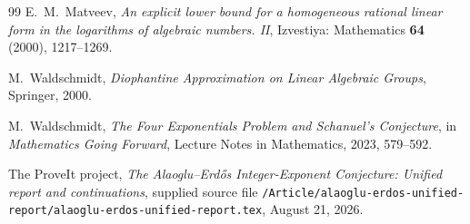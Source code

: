 \documentclass[11pt]{article}
\theoremstyle{definition}
\begin{document}
\begin{thebibliography}{99}
E.~M.~Matveev,
\newblock \emph{An explicit lower bound for a homogeneous rational linear form in the logarithms of algebraic numbers. II},
\newblock Izvestiya: Mathematics \textbf{64} (2000), 1217--1269.

M.~Waldschmidt,
\newblock \emph{Diophantine Approximation on Linear Algebraic Groups},
\newblock Springer, 2000.

M.~Waldschmidt,
\newblock \emph{The Four Exponentials Problem and Schanuel's Conjecture},
\newblock in \emph{Mathematics Going Forward}, Lecture Notes in Mathematics, 2023, 579--592.

The ProveIt project,
\newblock \emph{The Alaoglu--Erd\H{o}s Integer-Exponent Conjecture: Unified report and continuations},
\newblock supplied source file
\texttt{/Article/alaoglu-erdos-unified-report/alaoglu-erdos-unified-report.tex},
August 21, 2026.

\end{thebibliography}
\end{document}
